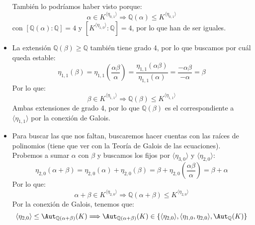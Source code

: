 \begin{ejemplo}
\begin{itemize}
            También lo podríamos haber visto porque:
            \begin{equation*}
                \alpha\in K^{\langle \eta_{0,1} \rangle } \Longrightarrow \mathbb{Q}(\alpha)\leq K^{\langle \eta_{0,1} \rangle }
            \end{equation*}
            con $[\mathbb{Q}(\alpha):\mathbb{Q}] = 4$ y $[K^{\langle \eta_{1,0} \rangle }:\mathbb{Q}] = 4$, por lo que han de ser iguales.
        \item La extensión $\mathbb{Q}(\beta)\geq \mathbb{Q}$ también tiene grado 4, por lo que buscamos por cuál queda estable:
            \begin{equation*}
                \eta_{1,1}(\beta) = \eta_{1,1}\left(\frac{\alpha\beta}{\alpha}\right) = \frac{\eta_{1,1}(\alpha\beta)}{\eta_{1,1}(\alpha)} = \frac{-\alpha\beta}{-\alpha} = \beta
            \end{equation*}
            Por lo que:
            \begin{equation*}
                \beta\in K^{\langle \eta_{1,1} \rangle } \Longrightarrow \mathbb{Q}(\beta) \leq K^{\langle \eta_{1,1} \rangle }
            \end{equation*}
            Ambas extensiones de grado 4, por lo que $\mathbb{Q}(\beta)$ es el correspondiente a $\langle \eta_{1,1} \rangle $ por la conexión de Galois.
        \item Para buscar las que nos faltan, buscaremos hacer cuentas con las raíces de polinomios (tiene que ver con la Teoría de Galois de las ecuaciones). Probemos a sumar $\alpha$ con $\beta$ y buscamos los fijos por $\langle \eta_{3,0} \rangle $ y $\langle \eta_{2,0} \rangle $:
            \begin{equation*}
                \eta_{2,0}(\alpha+\beta) = \eta_{2,0}(\alpha) + \eta_{2,0}(\beta) = \beta + \eta_{2,0}\left(\frac{\alpha\beta}{\alpha}\right) = \beta + \alpha
            \end{equation*}
            Por lo que:
            \begin{equation*}
                \alpha + \beta \in K^{\langle \eta_{2,0} \rangle } \Longrightarrow \mathbb{Q}(\alpha+\beta)\leq K^{\langle \eta_{2,0} \rangle }
            \end{equation*}
            Por la conexión de Galois, tenemos que:
            \begin{equation*}
                \langle \eta_{2,0} \rangle  \leq \Aut_{\mathbb{Q}(\alpha+\beta)}(K) \Longrightarrow \Aut_{\mathbb{Q}(\alpha+\beta)}(K) \in \{\langle \eta_{2,0} \rangle, \langle \eta_{1,0},\eta_{2,0} \rangle, \Aut_\mathbb{Q}(K)  \}

\end{equation*}
\end{itemize}
\end{ejemplo}

